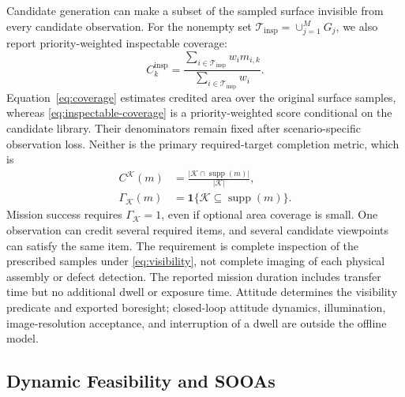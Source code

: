 \documentclass{IEEEtaes}
\theoremstyle{remark}
\theoremstyle{plain}
\begin{document}
Candidate generation can make a subset of the sampled surface invisible from every candidate observation. For the nonempty set $\mathcal T_{\mathrm{insp}}=\cup_{j=1}^{M}G_j$, we also report priority-weighted inspectable coverage:
\begin{equation}
  C_k^{\mathrm{insp}}=
  \frac{\sum_{i\in\mathcal T_{\mathrm{insp}}}w_i m_{i,k}}
  {\sum_{i\in\mathcal T_{\mathrm{insp}}}w_i}.
  \label{eq:inspectable-coverage}
\end{equation}
Equation~\eqref{eq:coverage} estimates credited area over the original surface samples, whereas \eqref{eq:inspectable-coverage} is a priority-weighted score conditional on the candidate library. Their denominators remain fixed after scenario-specific observation loss. Neither is the primary required-target completion metric, which is
\begin{equation}
  \begin{aligned}
  C^{\mathcal K}(m)&=\frac{|\mathcal K\cap\operatorname{supp}(m)|}{|\mathcal K|},\\
  \Gamma_{\mathcal K}(m)&=\mathbf1\{\mathcal K\subseteq\operatorname{supp}(m)\}.
  \end{aligned}
  \label{eq:required-goal}
\end{equation}
Mission success requires $\Gamma_{\mathcal K}=1$, even if optional area coverage is small. One observation can credit several required items, and several candidate viewpoints can satisfy the same item. The requirement is complete inspection of the prescribed samples under \eqref{eq:visibility}, not complete imaging of each physical assembly or defect detection. The reported mission duration includes transfer time but no additional dwell or exposure time. Attitude determines the visibility predicate and exported boresight; closed-loop attitude dynamics, illumination, image-resolution acceptance, and interruption of a dwell are outside the offline model.

\subsection{Dynamic Feasibility and SOOAs}
\end{document}
